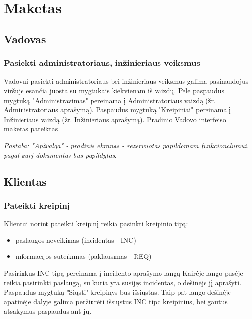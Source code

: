 
\section{Maketas}

\subsection{Vadovas}

	\subsubsection{Pasiekti administratoriaus, inžinieriaus veiksmus}
		
	Vadovui pasiekti administratoriaus bei inžinieriaus veiksmus galima pasinaudojus viršuje esančia juosta su mygtukais kiekvienam iš vaizdų.
	Pele paspaudus mygtuką "Administravimas" pereinama į Administratoriaus vaizdą (žr. Administratoriaus aprašymą).
	Paspaudus mygtuką "Kreipiniai" pereinama į Inžinieriaus vaizdą (žr. Inžinieriaus aprašymą).
	Pradinio Vadovo interfeiso maketas pateiktas 
	
	\textit{Pastaba: "Apžvalga" - pradinis ekranas - rezervuotas papildomam funkcionalumui, pagal kurį dokumentas bus papildytas.}
	
	
\subsection{Klientas}

	\subsubsection{Pateikti kreipinį}
	
	Klientui norint pateikti kreipinį reikia pasinkti kreipinio tipą:
	
	\begin{itemize}
		\item paslaugos neveikimas (incidentas - INC)
		\item informacijos suteikimas (paklausimas - REQ)
	\end{itemize}
	
	Pasirinkus INC tipą pereinama į incidento aprašymo langą 
	Kairėje lango pusėje reikia pasirinkti paslaugą, su kuria yra susijęs incidentas, o dešinėje jį aprašyti.
	Paspaudus mygtuką "Siųsti" kreipinys bus išsiųstas.
	Taip pat lango dešinėje apatinėje dalyje galima peržiūrėti išsiųstus INC tipo kreipinius, bei gautus atsakymus paspaudus ant jų.
	
